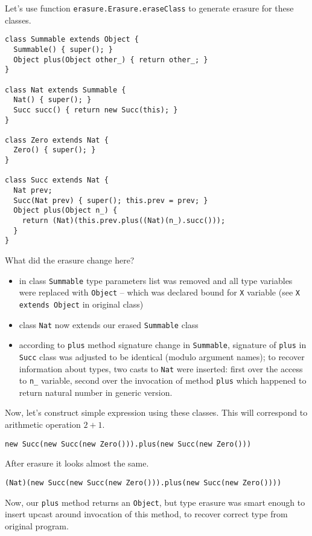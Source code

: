 \documentclass{article}[12pt]
\begin{document}
Let's use function \texttt{erasure.Erasure.eraseClass} to generate
erasure for these classes.

\begin{verbatim}
class Summable extends Object {
  Summable() { super(); }
  Object plus(Object other_) { return other_; }
}

class Nat extends Summable {
  Nat() { super(); }
  Succ succ() { return new Succ(this); }
}

class Zero extends Nat { 
  Zero() { super(); }
}

class Succ extends Nat {
  Nat prev;
  Succ(Nat prev) { super(); this.prev = prev; }
  Object plus(Object n_) {
    return (Nat)(this.prev.plus((Nat)(n_).succ())); 
  }
}
\end{verbatim}
What did the erasure change here?

\begin{itemize}
\item in class \texttt{Summable} type parameters list was removed
   and all type variables were replaced with \texttt{Object} --
   which was declared bound for \texttt{X} variable (see
   \texttt{X extends Object} in original class)
\item class \texttt{Nat} now extends our erased \texttt{Summable}
  class
\item according to \texttt{plus} method signature change in
  \texttt{Summable}, signature of \texttt{plus} in \texttt{Succ}
  class was adjusted to be identical (modulo argument names);
  to recover information about types, two casts to \texttt{Nat}
  were inserted: first over the access to \texttt{n\_} variable,
  second over the invocation of method \texttt{plus} which
  happened to return natural number in generic version.
\end{itemize}
Now, let's construct simple expression using these classes. This
will correspond to arithmetic operation $2 + 1$.

\begin{verbatim}
new Succ(new Succ(new Zero())).plus(new Succ(new Zero()))
\end{verbatim}
After erasure it looks almost the same.
\begin{verbatim}
(Nat)(new Succ(new Succ(new Zero())).plus(new Succ(new Zero())))
\end{verbatim}

Now, our \texttt{plus} method returns an \texttt{Object}, but
type erasure was smart enough to insert upcast around invocation
of this method, to recover correct type from original program.
\end{document}
